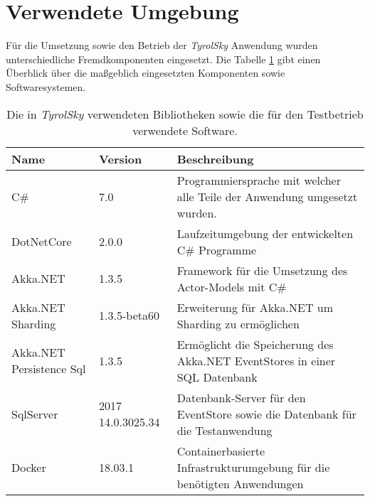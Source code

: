 \section{Verwendete Umgebung}
Für die Umsetzung sowie den Betrieb der \textit{TyrolSky} Anwendung wurden unterschiedliche Fremdkomponenten eingesetzt. Die Tabelle \ref{tab:implementation:EnvironmentVersions} gibt einen Überblick über die maßgeblich eingesetzten Komponenten sowie Softwaresystemen. 

\begin{table}[h]
  \centering
  \begin{tabular}{llp{6.5cm}}
  Name      & Version    & Beschreibung \\ \hline
  C\#     & 7.0        & Programmiersprache mit welcher alle Teile der Anwendung umgesetzt wurden. \\
  DotNetCore   & 2.0.0       & Laufzeitumgebung der entwickelten C\# Programme \\
  Akka.NET    & 1.3.5       & Framework für die Umsetzung des  Actor-Models mit C\# \\
  Akka.NET Sharding & 1.3.5-beta60  & Erweiterung für Akka.NET um Sharding zu ermöglichen \\
  Akka.NET Persistence Sql & 1.3.5  & Ermöglicht die Speicherung des Akka.NET EventStores in einer SQL Datenbank\\
  SqlServer    & 2017 14.0.3025.34 & Datenbank-Server für den EventStore sowie die Datenbank für die Testanwendung\\
  Docker     & 18.03.1      & Containerbasierte Infrastrukturumgebung für die benötigten Anwendungen\\
    \end{tabular}
    \caption{Die in \textit{TyrolSky} verwendeten Bibliotheken sowie die für den Testbetrieb verwendete Software.}
    \label{tab:implementation:EnvironmentVersions}
    \end{table}